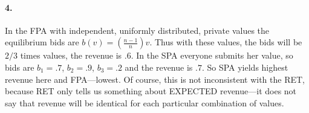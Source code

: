 \documentclass[a4paper,notitlepage,12pt]{article}
\begin{document}
\paragraph{4.}
In the FPA with independent, uniformly distributed, private values the equilibrium bids are $b(v) = \left(\frac{n-1}{n}\right) v$. Thus with these values, the bids will be $2/3$ times values, the revenue is $.6$. In the SPA everyone submits her value, so bids are $b_1 = .7$, $b_2 = .9$, $b_3 = .2$ and the revenue is $.7$. 
So SPA yields highest revenue here and FPA---lowest. 
Of course, this is not inconsistent with the RET, because RET only tells us something about EXPECTED revenue---it does not say that revenue will be identical for each particular combination of values.
\end{document}
